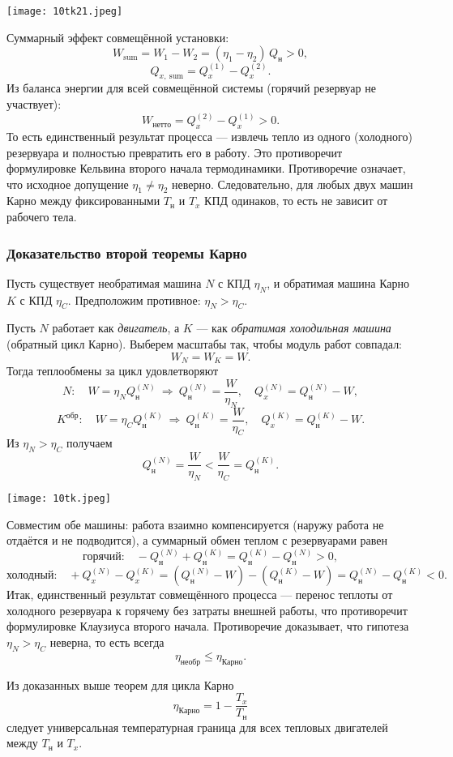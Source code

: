 \documentclass[12pt, a4paper]{article}%
\begin{document}
\begin{center}
\texttt{[image: 10tk21.jpeg]}
\label{fig:mpr}
\end{center}

Суммарный эффект совмещённой установки:
\[
W_{\text{sum}}=W_1-W_2=(\eta_1-\eta_2)\,Q_{\text{н}}>0,
\]
\[
Q_{x,\ \text{sum}}=Q_{x}^{(1)}-Q_{x}^{(2)}.
\]
Из баланса энергии для всей совмещённой системы (горячий резервуар не участвует):
\[
W_{\text{нетто}}=Q_{x}^{(2)}-Q_{x}^{(1)}>0.
\]
То есть единственный результат процесса — извлечь тепло из одного (холодного) 
резервуара и полностью превратить его в работу. Это противоречит формулировке
Кельвина второго начала термодинамики. Противоречие означает, что исходное допущение $\eta_1\ne\eta_2$ неверно. Следовательно, для любых двух машин Карно между фиксированными $T_{\text{н}}$ и $T_x$ КПД одинаков, то есть не зависит от рабочего тела. 

\subsubsection*{Доказательство второй теоремы Карно}

Пусть существует необратимая машина $N$ с КПД $\eta_N$, и обратимая машина Карно $K$ с КПД $\eta_C$. Предположим противное: $\eta_N>\eta_C$.

Пусть $N$ работает как \emph{двигатель}, а $K$ — как \emph{обратимая холодильная машина} (обратный цикл Карно). Выберем масштабы так, чтобы модуль работ совпадал:
\[
W_N=W_K=W.
\]
Тогда теплообмены за цикл удовлетворяют
\[
N:\quad W=\eta_N Q_{\text{н}}^{(N)}\ \Rightarrow\ Q_{\text{н}}^{(N)}=\frac{W}{\eta_N},\quad Q_{x}^{(N)}=Q_{\text{н}}^{(N)}-W,
\]
\[
K^{\text{обр}}:\quad W=\eta_C Q_{\text{н}}^{(K)}\ \Rightarrow\ Q_{\text{н}}^{(K)}=\frac{W}{\eta_C},\quad Q_{x}^{(K)}=Q_{\text{н}}^{(K)}-W.
\]
Из $\eta_N>\eta_C$ получаем
\[
Q_{\text{н}}^{(N)}=\frac{W}{\eta_N}<\frac{W}{\eta_C}=Q_{\text{н}}^{(K)}.
\]

\begin{center}
\texttt{[image: 10tk.jpeg]}
\label{fig:mpr}
\end{center}

Совместим обе машины: работа взаимно компенсируется (наружу работа не отдаётся 
и не подводится), а суммарный обмен теплом с резервуарами равен
\[
\text{горячий:}\quad -Q_{\text{н}}^{(N)}+Q_{\text{н}}^{(K)}=Q_{\text{н}}^{(K)}-Q_{\text{н}}^{(N)}>0,
\]
\[
\text{холодный:}\quad +Q_{x}^{(N)}-Q_{x}^{(K)}=(Q_{\text{н}}^{(N)}-W)-(Q_{\text{н}}^{(K)}-W)=Q_{\text{н}}^{(N)}-Q_{\text{н}}^{(K)}<0.
\]
Итак, единственный результат совмещённого процесса — перенос теплоты от
холодного резервуара к горячему без затраты внешней работы, что противоречит формулировке Клаузиуса второго начала. Противоречие доказывает, что гипотеза $\eta_N>\eta_C$ неверна, то есть всегда
\[
\eta_{\text{необр}}\le \eta_{\text{Карно}}.
\]

Из доказанных выше теорем для цикла Карно
\[
\eta_{\text{Карно}}=1-\frac{T_x}{T_{\text{н}}}
\]
следует универсальная температурная граница для всех тепловых двигателей между $T_{\text{н}}$ и $T_x$. 
\end{document}
